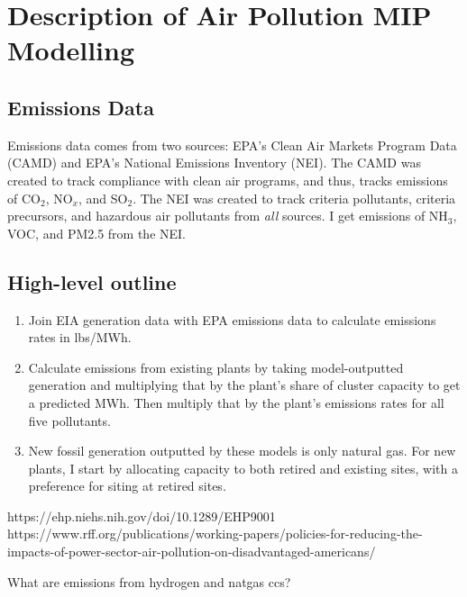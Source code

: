 \documentclass[a4paper]{article}
\theoremstyle{definition}
\theoremstyle{plain}
\begin{document}
\section{Description of Air Pollution MIP Modelling}

\subsection{Emissions Data}
Emissions data comes from two sources: EPA's Clean Air Markets Program Data (CAMD) and EPA's National Emissions Inventory (NEI).  The CAMD was created to track compliance with clean air programs, and thus, tracks emissions of CO$_2$, NO$_x$, and SO$_2$.  The NEI was created to track criteria pollutants, criteria precursors, and hazardous air pollutants from \textit{all} sources.  I get emissions of NH$_3$, VOC, and PM2.5 from the NEI. 

\subsection{High-level outline}
\begin{enumerate}
    \item Join EIA generation data with EPA emissions data to calculate emissions rates in lbs/MWh.
    \item Calculate emissions from existing plants by taking model-outputted generation and multiplying that by the plant's share of cluster capacity to get a predicted MWh.  Then multiply that by the plant's emissions rates for all five pollutants.
    \item New fossil generation outputted by these models is only natural gas.  For new plants, I start by allocating capacity to both retired and existing sites, with a preference for siting at retired sites.
\end{enumerate}

https://ehp.niehs.nih.gov/doi/10.1289/EHP9001
https://www.rff.org/publications/working-papers/policies-for-reducing-the-impacts-of-power-sector-air-pollution-on-disadvantaged-americans/

What are emissions from hydrogen and natgas ccs?

\begin{singlespace}
\newpage

%

\end{singlespace}
\end{document}
